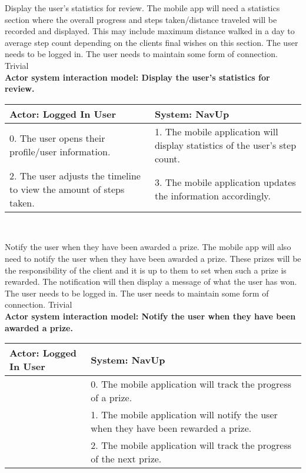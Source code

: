 \FuncReq
{Display the user's statistics for review.}
{The mobile app will need a statistics section where the overall progress and steps taken/distance traveled will be recorded and displayed. This may include maximum distance walked in a day to average step count depending on the clients final wishes on this section.}
{The user needs to be logged in.
The user needs to maintain some form of connection.}
{Trivial}
\\
\textbf{Actor system interaction model: Display the user's statistics for review. }\\
\begin{tabular}{ | p{6cm} | p{6cm} |}
\hline
Actor: Logged In User & System: NavUp \\ \hline
0. The user opens their profile/user information. & 1. The mobile application will display statistics of the user's step count.\\ \hline
2. The user adjusts the timeline to view the amount of steps taken. & 3. The mobile application updates the information accordingly. \\ \hline
\end{tabular}
\\
\bigskip

\FuncReq
{Notify the user when they have been awarded a prize.}
{The mobile app will also need to notify the user when they have been awarded a prize. These prizes will be the responsibility of the client and it is up to them to set when such a prize is rewarded. The notification will then display a message of what the user has won.}
{The user needs to be logged in.
The user needs to maintain some form of connection.}
{Trivial}
\\
\textbf{Actor system interaction model: Notify the user when they have been awarded a prize.}\\
\begin{tabular}{ | p{6cm} | p{6cm} |}
\hline
Actor: Logged In User & System: NavUp \\ \hline
& 0. The mobile application will track the progress of a prize.\\ \hline
& 1. The mobile application will notify the user when they have been rewarded a prize.\\ \hline
& 2. The mobile application will track the progress of the next prize.\\ \hline
\end{tabular}
\\
\bigskip

